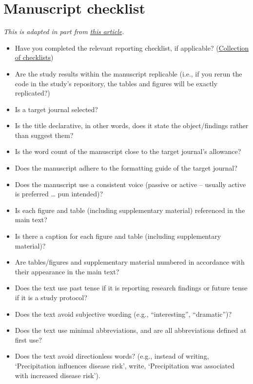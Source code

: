 \documentclass[
]{book}
\providecommand{\tightlist}{%
  \setlength{\itemsep}{0pt}\setlength{\parskip}{0pt}}
\begin{document}
\hypertarget{manuscript-checklist}{%
\section{Manuscript checklist}\label{manuscript-checklist}}

\emph{This is adapted in part from \href{https://www.nature.com/articles/d41586-019-01431-z}{this article}.}

\begin{itemize}
\tightlist
\item
  Have you completed the relevant reporting checklist, if applicable? (\href{https://www.equator-network.org/about-us/what-is-a-reporting-guideline/}{Collection of checklists})
\item
  Are the study results within the manuscript replicable (i.e., if you rerun the code in the study's repository, the tables and figures will be exactly replicated?)
\item
  Is a target journal selected?
\item
  Is the title declarative, in other words, does it state the object/findings rather than suggest them?
\item
  Is the word count of the manuscript close to the target journal's allowance?
\item
  Does the manuscript adhere to the formatting guide of the target journal?
\item
  Does the manuscript use a consistent voice (passive or active -- usually active is preferred \ldots{} pun intended)?
\item
  Is each figure and table (including supplementary material) referenced in the main text?
\item
  Is there a caption for each figure and table (including supplementary material)?
\item
  Are tables/figures and supplementary material numbered in accordance with their appearance in the main text?
\item
  Does the text use past tense if it is reporting research findings or future tense if it is a study protocol?
\item
  Does the text avoid subjective wording (e.g., ``interesting'', ``dramatic'')?
\item
  Does the text use minimal abbreviations, and are all abbreviations defined at first use?
\item
  Does the text avoid directionless words? (e.g., instead of writing, `Precipitation influences disease risk', write, `Precipitation was associated with increased disease risk').

\end{itemize}
\end{document}
